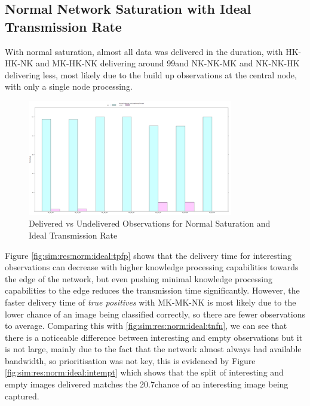 \subsection{Normal Network Saturation with Ideal Transmission Rate}

With normal saturation, almost all data was delivered in the duration, with HK-HK-NK and MK-HK-NK delivering around 99\percentage and NK-NK-MK and NK-NK-HK delivering less, most likely due to the build up observations at the central node, with only a single node processing.

	\begin{figure}[h]
	\centering
	\includegraphics[width=0.8\textwidth]{Chap7/figures/plots/normal_ideal/delvsundel_percent.png}
	\caption{Delivered vs Undelivered Observations for Normal Saturation and Ideal Transmission Rate}
	\label{fig:sim:res:norm:ideal:delundel}
	\end{figure}

	Figure \ref{fig:sim:res:norm:ideal:tpfp} shows that the delivery time for interesting observations can decrease with higher knowledge processing capabilities towards the edge of the network, but even pushing minimal knowledge processing capabilities to the edge reduces the transmission time significantly. However, the faster delivery time of \textit{true positives} with MK-MK-NK is most likely due to the lower chance of an image being classified correctly, so there are fewer observations to average. Comparing this with \ref{fig:sim:res:norm:ideal:tnfn}, we can see that there is a noticeable difference between interesting and empty observations but it is not large, mainly due to the fact that the network almost always had available bandwidth, so prioritisation was not key, this is evidenced by Figure \ref{fig:sim:res:norm:ideal:intempt} which shows that the split of interesting and empty images delivered matches the 20.7\percentage chance of an interesting image being captured.

